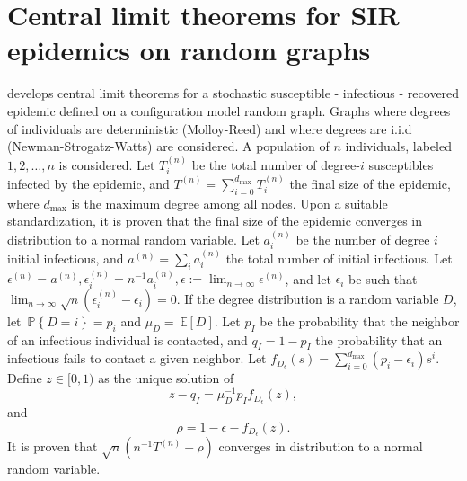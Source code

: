 \documentclass[letterpaper, 10 pt, conference]{article}
\newcommand\pr[1]{\, \mathbb{P} \left\lbrace #1 \right\rbrace}
\newcommand\expec[1]{\, \mathbb{E} \left\lbrack #1 \right\rbrack}
\begin{document}
\section{Central limit theorems for SIR epidemics on random graphs}\label{section:epidemics}
\citet{ball2018central} develops central limit theorems for a stochastic susceptible - infectious - recovered epidemic defined on a configuration model \citep{Newman_2018} random graph. Graphs where degrees of individuals are deterministic (Molloy-Reed) and where degrees are i.i.d (Newman-Strogatz-Watts) are considered. A population of $n$ individuals, labeled $1, 2, \dots, n$ is considered. Let $T_{i}^{(n)}$ be the total number of degree-$i$ susceptibles infected by the epidemic, and $T^{(n)} = \sum_{i = 0}^{d_\text{max}} T_{i}^{(n)}$ the final size of the epidemic, where $d_\text{max}$ is the maximum degree among all nodes. Upon a suitable standardization, it is proven that the final size of the epidemic converges in distribution to a normal random variable.  Let $a_{i}^{(n)}$ be the number of degree $i$ initial infectious, and $a^{(n)} = \sum_i a_{i}^{(n)}$ the total number of initial infectious. Let  $\epsilon^{(n)} = a^{(n)}, \epsilon_{i}^{(n)} = n^{-1} a_{i}^{(n)}, \epsilon := \lim_{n \rightarrow \infty} \epsilon^{(n)}$, and let $\epsilon_i$ be such that $\lim_{n \rightarrow \infty} \sqrt{n} (\epsilon_{i}^{(n)} - \epsilon_i)  =0$. If the degree distribution is a random variable $D$, let $\pr{D = i} = p_i$ and $\mu_D = \expec{D}$. Let $p_I$ be the probability that the neighbor of an infectious individual is contacted, and $q_I = 1 - p_I$ the probability that an infectious fails to contact a given neighbor. Let $f_{D_{\epsilon}} (s) = \sum_{i = 0}^{d_\text{max}} (p_i - \epsilon_{i})s^i$. Define $z \in [0,1)$ as the unique solution of 
\begin{equation}
	z - q_I = \mu_{D}^{-1} p_I f_{D_\epsilon} (z),
\end{equation}
and 
\begin{equation}
	\rho = 1 - \epsilon - f_{D_\epsilon} (z).
\end{equation}
It is proven that $\sqrt{n} (n^{-1} T^{(n)} - \rho)$ converges in distribution to a normal random variable.




\end{document}
